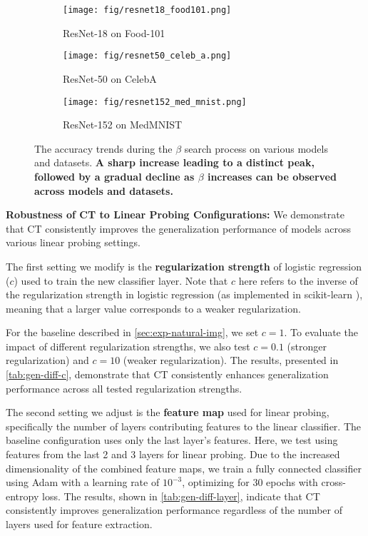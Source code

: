 \begin{figure*}[h]
\vskip 0.1in
\begin{center}
\begin{subfigure}{0.32\linewidth}
    \centering
    \texttt{[image: fig/resnet18\_food101.png]}
    \caption{\small ResNet-18 on Food-101}
    \label{fig:resnet18_food101}
\end{subfigure}
\hfill
\begin{subfigure}{0.32\linewidth}
    \centering
    \texttt{[image: fig/resnet50\_celeb\_a.png]}
    \caption{\small ResNet-50 on CelebA}
    \label{fig:resnet50_celeb_a}
\end{subfigure}
\hfill
\begin{subfigure}{0.32\linewidth}
    \centering
    \texttt{[image: fig/resnet152\_med\_mnist.png]}
    \caption{\small ResNet-152 on MedMNIST}
    \label{fig:resnet152_med_mnist}
\end{subfigure}
\caption{\small The accuracy trends during the $\beta$ search process on various models and datasets. \textbf{A sharp increase leading to a distinct peak, followed by a gradual decline as $\beta$ increases can be observed across models and datasets.}}
\label{fig:acc-trend}
\end{center}
\vskip -0.1in
\end{figure*}

\textbf{Robustness of CT to Linear Probing Configurations:} We demonstrate that CT consistently improves the generalization performance of models across various linear probing settings.

The first setting we modify is the \textbf{regularization strength} of logistic regression ($c$) used to train the new classifier layer. Note that $c$ here refers to the inverse of the regularization strength in logistic regression (as implemented in scikit-learn \cite{buitinck2013sklearn}), meaning that a larger value corresponds to a weaker regularization.

For the baseline described in \cref{sec:exp-natural-img}, we set $c=1$. To evaluate the impact of different regularization strengths, we also test $c=0.1$ (stronger regularization) and $c=10$ (weaker regularization). The results, presented in \cref{tab:gen-diff-c}, demonstrate that CT consistently enhances generalization performance across all tested regularization strengths.

The second setting we adjust is the \textbf{feature map} used for linear probing, specifically the number of layers contributing features to the linear classifier. The baseline configuration uses only the last layer's features. Here, we test using features from the last 2 and 3 layers for linear probing. Due to the increased dimensionality of the combined feature maps, we train a fully connected classifier using Adam with a learning rate of $10^{-3}$, optimizing for 30 epochs with cross-entropy loss. The results, shown in \cref{tab:gen-diff-layer}, indicate that CT consistently improves generalization performance regardless of the number of layers used for feature extraction.

